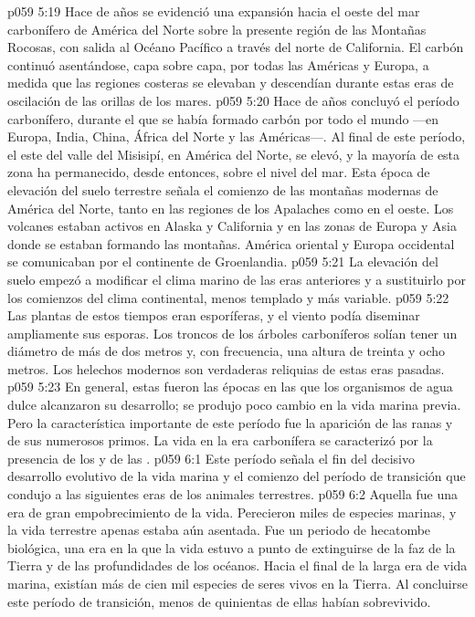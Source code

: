 \vs p059 5:19 \pc Hace  de años se evidenció una expansión hacia el oeste del mar carbonífero de América del Norte sobre la presente región de las Montañas Rocosas, con salida al Océano Pacífico a través del norte de California. El carbón continuó asentándose, capa sobre capa, por todas las Américas y Europa, a medida que las regiones costeras se elevaban y descendían durante estas eras de oscilación de las orillas de los mares.
\vs p059 5:20 \pc Hace  de años concluyó el período carbonífero, durante el que se había formado carbón por todo el mundo ---en Europa, India, China, África del Norte y las Américas---. Al final de este período, el este del valle del Misisipí, en América del Norte, se elevó, y la mayoría de esta zona ha permanecido, desde entonces, sobre el nivel del mar. Esta época de elevación del suelo terrestre señala el comienzo de las montañas modernas de América del Norte, tanto en las regiones de los Apalaches como en el oeste. Los volcanes estaban activos en Alaska y California y en las zonas de Europa y Asia donde se estaban formando las montañas. América oriental y Europa occidental se comunicaban por el continente de Groenlandia.
\vs p059 5:21 La elevación del suelo empezó a modificar el clima marino de las eras anteriores y a sustituirlo por los comienzos del clima continental, menos templado y más variable.
\vs p059 5:22 Las plantas de estos tiempos eran esporíferas, y el viento podía diseminar ampliamente sus esporas. Los troncos de los árboles carboníferos solían tener un diámetro de más de dos metros y, con frecuencia, una altura de treinta y ocho metros. Los helechos modernos son verdaderas reliquias de estas eras pasadas.
\vs p059 5:23 En general, estas fueron las épocas en las que los organismos de agua dulce alcanzaron su desarrollo; se produjo poco cambio en la vida marina previa. Pero la característica importante de este período fue la aparición  de las ranas y de sus numerosos primos. La vida en la era carbonífera se caracterizó por la presencia de los  y de las .
\vs p059 6:1 Este período señala el fin del decisivo desarrollo evolutivo de la vida marina y el comienzo del período de transición que condujo a las siguientes eras de los animales terrestres.
\vs p059 6:2 Aquella fue una era de gran empobrecimiento de la vida. Perecieron miles de especies marinas, y la vida terrestre apenas estaba aún asentada. Fue un periodo de hecatombe biológica, una era en la que la vida estuvo a punto de extinguirse de la faz de la Tierra y de las profundidades de los océanos. Hacia el final de la larga era de vida marina, existían más de cien mil especies de seres vivos en la Tierra. Al concluirse este período de transición, menos de quinientas de ellas habían sobrevivido.
